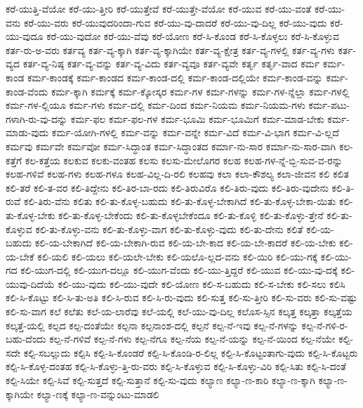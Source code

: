 {ಕರೆ-ಯುತ್ತಿ-ವೆಯೋ
ಕರೆ-ಯು-ತ್ತೀರಿ
ಕರೆ-ಯುತ್ತೇವೆ
ಕರೆ-ಯುತ್ತೇ-ವೆಯೋ
ಕರೆ-ಯುವ
ಕರೆ-ಯು-ವಂತೆ
ಕರೆ-ಯು-ವನು
ಕರೆ-ಯು-ವರು
ಕರೆ-ಯುವುದರಿಂದಾ-ಗುವ
ಕರೆ-ಯು-ವು-ದಾದರೆ
ಕರೆ-ಯು-ವು-ದಿಲ್ಲ
ಕರೆ-ಯು-ವುದು
ಕರೆ-ಯು-ವುದೂ
ಕರೆ-ಯು-ವುದೋ
ಕರೆ-ಯು-ವೆವು
ಕರೆ-ಯೋಣ
ಕರೆ-ಸಿ-ಕೊಂಡ
ಕರೆ-ಸಿ-ಕೊಳ್ಳಲು
ಕರೆ-ಸಿ-ಕೊಳ್ಳುವ
ಕರ್ತ-ರು-ಅ-ವರು
ಕರ್ತವ್ಯ
ಕರ್ತ-ವ್ಯ-ಕ್ಕಾಗಿ
ಕರ್ತ-ವ್ಯ-ಕ್ಕಾಗಿಯೇ
ಕರ್ತ-ವ್ಯ-ಕ್ಷೇತ್ರ
ಕರ್ತ-ವ್ಯ-ಗಳಲ್ಲಿ
ಕರ್ತ-ವ್ಯ-ಗಳು
ಕರ್ತ-ವ್ಯದ
ಕರ್ತ-ವ್ಯ-ನಿಷ್ಠ
ಕರ್ತ-ವ್ಯ-ವನ್ನು
ಕರ್ತ-ವ್ಯ-ವಿದು
ಕರ್ತ-ವ್ಯವೂ
ಕರ್ತ-ವ್ಯವೇ
ಕರ್ತೃ
ಕರ್ತೃ-ವಾದ
ಕರ್ಮ
ಕರ್ಮ-ಕಾಂಡ
ಕರ್ಮ-ಕಾಂಡಕ್ಕೆ
ಕರ್ಮ-ಕಾಂಡದ
ಕರ್ಮ-ಕಾಂಡ-ದಲ್ಲಿ
ಕರ್ಮ-ಕಾಂಡ-ದಲ್ಲಿಯೇ
ಕರ್ಮ-ಕಾಂಡ-ವನ್ನು
ಕರ್ಮ-ಕಾಂಡ-ವೆಂದು
ಕರ್ಮ-ಕ್ಕಾಗಿ
ಕರ್ಮಕ್ಕೆ
ಕರ್ಮ-ಕ್ಕೋಸ್ಕರ
ಕರ್ಮ-ಗಳ
ಕರ್ಮ-ಗಳನ್ನು
ಕರ್ಮ-ಗಳ-ನ್ನೆಲ್ಲಾ
ಕರ್ಮ-ಗಳಲ್ಲಿ
ಕರ್ಮ-ಗಳ-ಲ್ಲಿಯೂ
ಕರ್ಮ-ಗಳು
ಕರ್ಮ-ದಲ್ಲಿ
ಕರ್ಮ-ದಿಂದ
ಕರ್ಮ-ನಿಯಮ
ಕರ್ಮ-ನಿಯಮ-ಗಳು
ಕರ್ಮ-ಪಟು-ಗಳಾಗಿ-ರು-ವು-ದನ್ನು
ಕರ್ಮ-ಫಲ
ಕರ್ಮ-ಫಲ-ಗಳ
ಕರ್ಮ-ಭೂಮಿ
ಕರ್ಮ-ಭೂಮಿಗೆ
ಕರ್ಮ-ಮಾಡ-ಬೇಕು
ಕರ್ಮ-ಮಾಡು-ವುದು
ಕರ್ಮ-ಯೋಗಿ-ಗಳಲ್ಲಿ
ಕರ್ಮ-ವನ್ನು
ಕರ್ಮ-ವನ್ನೇ
ಕರ್ಮ-ವಿದೆ
ಕರ್ಮ-ವಿ-ಭಾಗ
ಕರ್ಮ-ವಿ-ಲ್ಲದೆ
ಕರ್ಮವು
ಕರ್ಮವೇ
ಕರ್ಮವೋ
ಕರ್ಮ-ಸಿದ್ಧಾಂತ
ಕರ್ಮ-ಸಿದ್ಧಾಂತದ
ಕರ್ಮಾ-ನು-ಸಾರ
ಕರ್ಮಾ-ನು-ಸಾರ-ವಾಗಿ
ಕಲ-ಕತ್ತೆಗೆ
ಕಲ-ಕತ್ತೆಯ
ಕಲಕುವ
ಕಲಕು-ವಂತಹ
ಕಲಸು
ಕಲಸು-ಮೇಲೊಗರ
ಕಲಹ
ಕಲಹ-ಗಳ-ನ್ನೆ-ಬ್ಬಿ-ಸುವ-ವ-ರನ್ನು
ಕಲಹ-ಗಳಿವೆ
ಕಲಹ-ಗಳು
ಕಲಹ-ಗಳೂ
ಕಲಹ-ವಿಲ್ಲ-ದಿ-ರಲಿ
ಕಲಹವು
ಕಲಾ
ಕಲಾ-ಕೌಶಲ್ಯ
ಕಲಾ-ಜೀವನ
ಕಲಿ
ಕಲಿತ
ಕಲಿ-ತರೆ
ಕಲಿ-ತ-ವರ
ಕಲಿ-ತಿದ್ದೇನು
ಕಲಿ-ತಿರ-ಬಾ-ರದು
ಕಲಿ-ತಿರುವಿರೊ
ಕಲಿ-ತಿರು-ವುದು
ಕಲಿ-ತಿರು-ವುದೇನು
ಕಲಿ-ತಿ-ರುವೆ
ಕಲಿ-ತಿರು-ವೆನು
ಕಲಿತು
ಕಲಿ-ತು-ಕೊಳ್ಳ-ಬಹುದು
ಕಲಿ-ತು-ಕೊಳ್ಳ-ಬೇಕಾಗಿದೆ
ಕಲಿ-ತು-ಕೊಳ್ಳ-ಬೇಕಾ-ಯಿತು
ಕಲಿ-ತು-ಕೊಳ್ಳ-ಬೇಕು
ಕಲಿ-ತು-ಕೊಳ್ಳ-ಬೇಕೆಂದು
ಕಲಿ-ತು-ಕೊಳ್ಳಬೇಕೆಂದೂ
ಕಲಿ-ತು-ಕೊಳ್ಳಿ
ಕಲಿ-ತು-ಕೊಳ್ಳು-ತ್ತೇನೆ
ಕಲಿ-ತು-ಕೊಳ್ಳುವ
ಕಲಿ-ತು-ಕೊಳ್ಳು-ವನು
ಕಲಿ-ತು-ಕೊಳ್ಳು-ವಾಗ
ಕಲಿ-ತು-ಕೊಳ್ಳು-ವುದು
ಕಲಿ-ತು-ದೇನು
ಕಲಿತೆ
ಕಲಿ-ಯ-ಬಹುದು
ಕಲಿ-ಯ-ಬೇಕಾಗಿದೆ
ಕಲಿ-ಯ-ಬೇಕಾಗಿ-ರುವ
ಕಲಿ-ಯ-ಬೇ-ಕಾದ
ಕಲಿ-ಯ-ಬೇ-ಕಾದರೆ
ಕಲಿ-ಯ-ಬೇಕು
ಕಲಿ-ಯ-ಬೇಕೆ
ಕಲಿ-ಯಲಿ
ಕಲಿ-ಯಲು
ಕಲಿ-ಯಲೇ-ಬೇಕು
ಕಲಿ-ಯಲೊ-ಲ್ಲದ-ವನು
ಕಲಿ-ಯಿರಿ
ಕಲಿ-ಯು-ಗಕ್ಕೆ
ಕಲಿ-ಯು-ಗದ
ಕಲಿ-ಯುಗ-ದಲ್ಲಿ
ಕಲಿ-ಯುಗ-ದಲ್ಲೂ
ಕಲಿ-ಯುಗ-ವೆಂದು
ಕಲಿ-ಯು-ತ್ತಿದ್ದರೆ
ಕಲಿ-ಯುವ
ಕಲಿ-ಯು-ವು-ದಕ್ಕೆ
ಕಲಿ-ಯುವು-ದಿದೆಯೆ
ಕಲಿ-ಯು-ವುದು
ಕಲಿ-ಯು-ವುದೇ
ಕಲಿ-ಯೋಣ
ಕಲಿ-ಸ-ಬಹುದು
ಕಲಿ-ಸ-ಬೇಕು
ಕಲಿ-ಸಲು
ಕಲಿಸಿ
ಕಲಿ-ಸಿ-ಕೊಟ್ಟು
ಕಲಿ-ಸಿ-ತು-ಅತಿ
ಕಲಿ-ಸಿ-ರುವ
ಕಲಿ-ಸಿ-ರು-ವುದು
ಕಲಿ-ಸುತ್ತ
ಕಲಿ-ಸು-ತ್ತೀರಿ
ಕಲಿ-ಸು-ವರು
ಕಲಿ-ಸು-ವಷ್ಟು
ಕಲಿ-ಸು-ವಾಗ
ಕಲೆ
ಕಲೆತು
ಕಲೆ-ಯ-ಲಾರೆವು
ಕಲೆ-ಯಲ್ಲಿ
ಕಲೆ-ಯು-ವು-ದಿಲ್ಲ
ಕಲೊಸ-ಸ್ಸಿನ
ಕಲ್ಕತ್ತ
ಕಲ್ಕತ್ತಾ
ಕಲ್ಕತ್ತೆಯ
ಕಲ್ಕತ್ತೆ-ಯಲ್ಲಿ
ಕಲ್ಪದ
ಕಲ್ಪ-ದಂತೆಯೇ
ಕಲ್ಪನಾ
ಕಲ್ಪನಾಂಶ-ದಲ್ಲಿ
ಕಲ್ಪನೆ
ಕಲ್ಪ-ನೆ-ಇವು
ಕಲ್ಪ-ನೆ-ಗಳನ್ನು
ಕಲ್ಪ-ನೆ-ಗಳಿ-ರ-ಬಹು-ದೆಂದು
ಕಲ್ಪ-ನೆ-ಗಳಿವೆ
ಕಲ್ಪ-ನೆ-ಗಳು
ಕಲ್ಪ-ನೆಗೂ
ಕಲ್ಪ-ನೆಯ
ಕಲ್ಪ-ನೆ-ಯನ್ನು
ಕಲ್ಪ-ನೆ-ಯಿಂದ
ಕಲ್ಪ-ನೆಯೇ
ಕಲ್ಪಿ-ಸದೇ
ಕಲ್ಪಿ-ಸಬಲ್ಲುದು
ಕಲ್ಪಿಸಿ
ಕಲ್ಪಿ-ಸಿ-ಕೊಂಡರೆ
ಕಲ್ಪಿ-ಸಿ-ಕೊಂಡಿ-ರ-ಲಿಲ್ಲ
ಕಲ್ಪಿ-ಸಿ-ಕೊಟ್ಟಂತಾಗು-ವುದು
ಕಲ್ಪಿ-ಸಿ-ಕೊಟ್ಟರು
ಕಲ್ಪಿ-ಸಿ-ಕೊಳ್ಳ-ದಂತಹ
ಕಲ್ಪಿ-ಸಿ-ಕೊಳ್ಳು-ತ್ತಿ-ರು-ವರು
ಕಲ್ಪಿ-ಸಿ-ಕೊಳ್ಳುವ
ಕಲ್ಪಿ-ಸಿ-ಕೊಳ್ಳು-ವಿರಿ
ಕಲ್ಪಿ-ಸಿತು
ಕಲ್ಪಿ-ಸಿ-ದಂತೆ
ಕಲ್ಪಿ-ಸಿಯೇ
ಕಲ್ಪಿ-ಸಿವೆ
ಕಲ್ಪಿ-ಸುತ್ತದೆ
ಕಲ್ಪಿ-ಸುತ್ತಾನೆ
ಕಲ್ಪಿ-ಸು-ವುದು
ಕಲ್ಯಾಣ
ಕಲ್ಯಾ-ಣ-ಕಾರಿ
ಕಲ್ಯಾ-ಣ-ಕ್ಕಾಗಿ
ಕಲ್ಯಾ-ಣ-ಕ್ಕಾಗಿಯೇ
ಕಲ್ಯಾ-ಣಕ್ಕೆ
ಕಲ್ಯಾ-ಣ-ವನ್ನುಂಟು-ಮಾಡಲಿ
}
